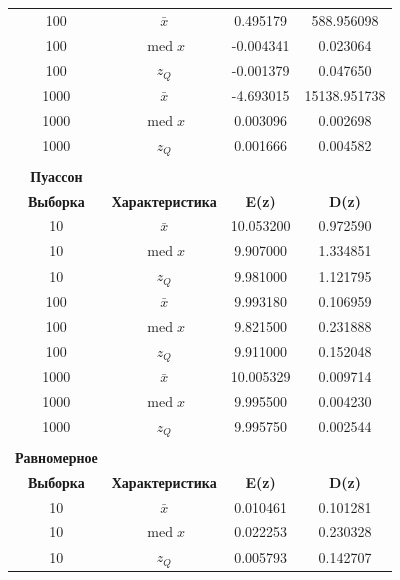 \documentclass[a4paper]{article}
\begin{document}
\begin{table}[!htbp]
{\begin{tabular}{|c|c|c|c|}
            100              & $\bar{x}$               & 0.495179      & 588.956098    \\
            100              & $\operatorname{med} x$  & -0.004341     & 0.023064      \\
            100              & $z_Q$                   & -0.001379     & 0.047650      \\            \hline

            1000             & $\bar{x}$               & -4.693015     & 15138.951738  \\
            1000             & $\operatorname{med} x$  & 0.003096      & 0.002698      \\
            1000             & $z_Q$                   & 0.001666      & 0.004582      \\
            \hline \\
            \multicolumn{1}{|c|}{\textbf{Пуассон}} \\
            \hline
            \textbf{Выборка} & \textbf{Характеристика} & \textbf{E(z)} & \textbf{D(z)} \\
            \hline
            10               & $\bar{x}$               & 10.053200     & 0.972590      \\
            10               & $\operatorname{med} x$  & 9.907000      & 1.334851      \\
            10               & $z_Q$                   & 9.981000      & 1.121795      \\            \hline

            100              & $\bar{x}$               & 9.993180      & 0.106959      \\
            100              & $\operatorname{med} x$  & 9.821500      & 0.231888      \\
            100              & $z_Q$                   & 9.911000      & 0.152048      \\            \hline

            1000             & $\bar{x}$               & 10.005329     & 0.009714      \\
            1000             & $\operatorname{med} x$  & 9.995500      & 0.004230      \\
            1000             & $z_Q$                   & 9.995750      & 0.002544      \\
            \hline \\
            \multicolumn{1}{|c|}{\textbf{Равномерное}} \\
            \hline
            \textbf{Выборка} & \textbf{Характеристика} & \textbf{E(z)} & \textbf{D(z)} \\
            \hline
            10               & $\bar{x}$               & 0.010461      & 0.101281      \\
            10               & $\operatorname{med} x$  & 0.022253      & 0.230328      \\
            10               & $z_Q$                   & 0.005793      & 0.142707      \\            \hline


\end{tabular}}
\end{table}
\end{document}
